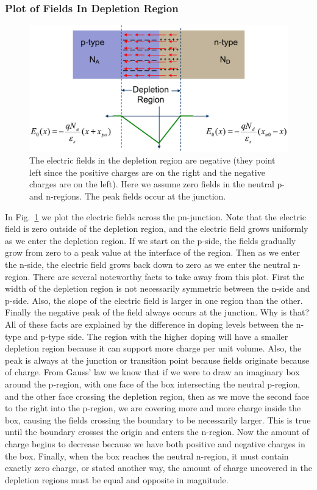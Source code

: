 \subsubsection{Plot of Fields In Depletion Region}
\begin{figure}[tb]
\centering
\includegraphics[width=.75\columnwidth]{slide18}
\caption{The electric fields in the depletion region are negative (they point left since the positive charges are on the right and the negative charges are on the left).  Here we assume zero fields in the neutral p- and n-regions.  The peak fields occur at the junction.}
\label{fig:slide18}
\end{figure}
In Fig.~\ref{fig:slide18} we plot the electric fields across the pn-junction.  Note that the electric field is zero outside of the depletion region, and the electric field grows uniformly as we enter the depletion region.  If we start on the p-side, the fields gradually grow from zero to a peak value at the interface of the region.  Then as we enter the n-side, the electric field grows back down to zero as we enter the neutral n-region.  
There are several noteworthy facts to take away from this plot.  First the width of the depletion region is not necessarily symmetric between the n-side and p-side.  Also, the slope of the electric field is larger in one region than the other.  Finally the negative peak of the field always occurs at the junction.  Why is that?
All of these facts are explained by the difference in doping levels between the n-type and p-type side.  The region with the higher doping will have a smaller depletion region because it can support more charge per unit volume.  Also, the peak is always at the junction or transition point because fields originate because of charge.  From Gauss' law we know that if we were to draw an imaginary box around the p-region, with one face of the box intersecting the neutral p-region, and the other face crossing the depletion region, then as we move the second face to the right into the p-region, we are covering more and more charge inside the box, causing the fields crossing the boundary to be necessarily larger.  This is true until the boundary crosses the origin and enters the n-region.  Now the amount of charge begins to decrease because we have both positive and negative charges in the box.  Finally, when the box reaches the neutral n-region, it must contain exactly zero charge, or stated another way, the amount of charge uncovered in the depletion regions must be equal and opposite in magnitude.
